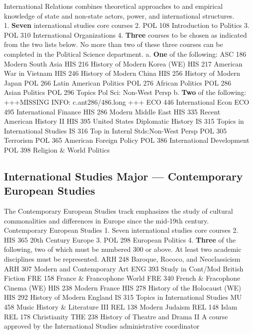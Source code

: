 \documentclass[
  letterpaper,
]{scrbook}
\begin{document}
International Relations combines theoretical approaches to and empirical
knowledge of state and non-state actors, power, and international
structures.\\
1. \textbf{Seven} international studies core courses 2. POL 108
Introduction to Politics 3. POL 310 International Organizations 4.
\textbf{Three} courses to be chosen as indicated from the two lists
below. No more than two of these three courses can be completed in the
Political Science department. a. \textbf{One} of the following: ASC 186
Modern South Asia HIS 216 History of Modern Korea (WE) HIS 217 American
War in Vietnam HIS 246 History of Modern China HIS 256 History of Modern
Japan POL 266 Latin American Politics POL 276 African Politics POL 286
Asian Politics POL 296 Topics Pol Sci: Non-West Persp b. \textbf{Two} of
the following: +++MISSING INFO: c.ant286/486.long +++ ECO 446
International Econ ECO 495 International Finance HIS 286 Modern Middle
East HIS 335 Recent American History II HIS 395 United States Diplomatic
History IS 315 Topics in International Studies IS 316 Top in Internl
Stds:Non-West Persp POL 305 Terrorism POL 365 American Foreign Policy
POL 386 International Development POL 398 Religion \& World Politics

\subsection{International Studies Major --- Contemporary European
Studies}\label{international-studies-major-contemporary-european-studies}

The Contemporary European Studies track emphasizes the study of cultural
commonalities and differences in Europe since the mid-19th century.
Contemporary European Studies 1. Seven international studies core
courses 2. HIS 365 20th Century Europe 3. POL 298 European Politics 4.
\textbf{Three} of the following, two of which must be numbered 300 or
above. At least two academic disciplines must be represented. ARH 248
Baroque, Rococo, and Neoclassicism ARH 307 Modern and Contemporary Art
ENG 393 Study in Cont/Mod British Fiction FRE 158 France \& Francophone
World FRE 340 French \& Fracophone Cinema (WE) HIS 238 Modern France HIS
278 History of the Holocaust (WE) HIS 292 History of Modern England IS
315 Topics in International Studies MU 458 Music History \& Literature
III REL 138 Modern Judaism REL 148 Islam REL 178 Christianity THE 238
History of Theatre and Drama II A course approved by the International
Studies administrative coordinator
\end{document}

